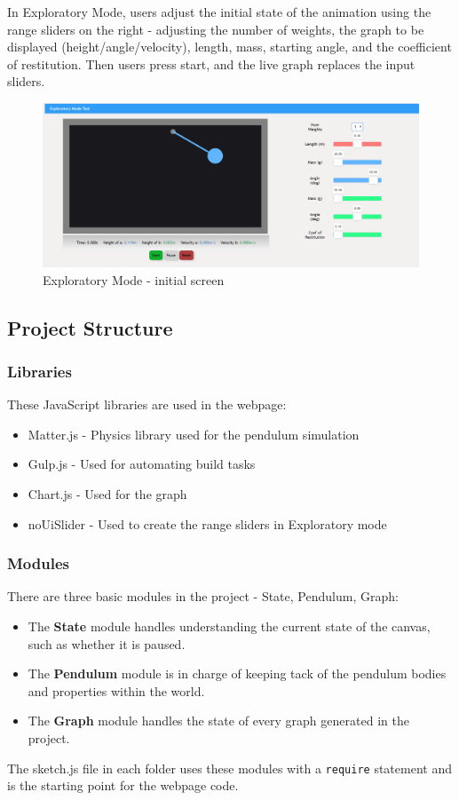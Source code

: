 In Exploratory Mode, users adjust the initial state of the animation using the range sliders on the right - adjusting the number of weights, the graph to be displayed (height/angle/velocity), length, mass, starting angle, and the coefficient of restitution. Then users press start, and the live graph replaces the input sliders. 
\begin{figure}[H]
  \includegraphics[width=5.5 in]{sim_pics/exploratory_start_1.png}
  \caption{Exploratory Mode - initial screen}
  \label{fig:Exploratory1}
\end{figure}

\subsection{Project Structure}
\subsubsection{Libraries}
These JavaScript libraries are used in the webpage:
\begin{itemize}
    \item Matter.js - Physics library used for the pendulum simulation
    \item Gulp.js - Used for automating build tasks
    \item Chart.js - Used for the graph
    \item noUiSlider - Used to create the range sliders in Exploratory mode
\end{itemize}

\subsubsection{Modules}
There are three basic modules in the project - State, Pendulum, Graph:
\begin{itemize}
    \item The \textbf{State} module handles understanding the current state of the canvas, such as whether it is paused.
    \item The \textbf{Pendulum} module is in charge of keeping tack of the pendulum bodies and properties within the world.
    \item The \textbf{Graph} module handles the state of every graph generated in the project.
\end{itemize}
The sketch.js file in each folder uses these modules with a \lstinline{require} statement and is the starting point for the webpage code.


